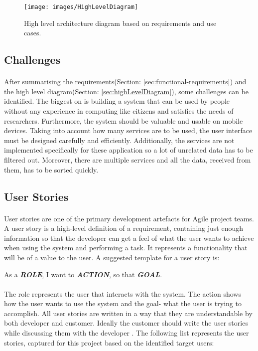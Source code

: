 \documentclass{l4proj}
\begin{document}
\begin{figure}[H]
		\centering
		\texttt{[image: images/HighLevelDiagram]}
		\caption{High level architecture diagram based on requirements and use cases.}
		\label{highLevelDiagram}
\end{figure}

\subsection{Challenges}
\paragraph{}
After summarising the requirements(Section: \ref{sec:functional-requirements}) and the high level diagram(Section: \ref{sec:highLevelDiagram}), some challenges can be identified. The biggest on is building a system that can be used by people without any experience in computing like citizens and satisfies the needs of researchers. Furthermore, the system should be valuable and usable on mobile devices. Taking into account how many services are to be used, the user interface must be designed carefully and efficiently. Additionally, the services are not implemented specifically for these application so a lot of unrelated data has to be filtered out. Moreover, there are multiple services and all the data, received from them, has to be sorted quickly.   

\subsection{User Stories}
\label{sec:userstories}
\paragraph{}
User stories are one of the primary development artefacts for Agile project teams. A user story is a high-level definition of a requirement, containing just enough information so that the developer can get a feel of what the user wants to achieve when using the system and performing a task. It represents a functionality that will be of a value to the user. A suggested template for a user story is: 

\begin{center}
	As a \textbf{\textit{ROLE}}, I want to \textbf{\textit{ACTION}}, so that \textbf{\textit{GOAL}}. \cite{sets}
\end{center}
\paragraph{}
The role represents the user that interacts with the system. The action shows how the user wants to use the system and the goal- what the user is trying to accomplish. All user stories are written in a way that they are understandable by both developer and customer. Ideally the customer should write the user stories while discussing them with the developer \cite{sets}. The following list represents the user stories, captured for this project based on the identified target users:    
\end{document}
